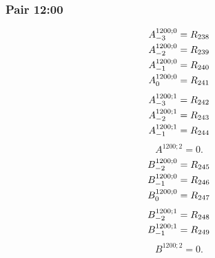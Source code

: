 \documentclass[11pt,a4paper]{article}
\begin{document}
\subsubsection{Pair 12:00}
\begin{equation}
\shortstack[l]{$\displaystyle A^{1200;0}_{-3}=R_{238}$\\
$\displaystyle A^{1200;0}_{-2}=R_{239}$\\
$\displaystyle A^{1200;0}_{-1}=R_{240}$\\
$\displaystyle A^{1200;0}_{0}=R_{241}$}
\label{eq:cat-map-270}
\end{equation}
\begin{equation}
\shortstack[l]{$\displaystyle A^{1200;1}_{-3}=R_{242}$\\
$\displaystyle A^{1200;1}_{-2}=R_{243}$\\
$\displaystyle A^{1200;1}_{-1}=R_{244}$}
\label{eq:cat-map-271}
\end{equation}
\begin{equation}
A^{1200;2}=0.
\label{eq:cat-map-272}
\end{equation}
\begin{equation}
\shortstack[l]{$\displaystyle B^{1200;0}_{-2}=R_{245}$\\
$\displaystyle B^{1200;0}_{-1}=R_{246}$\\
$\displaystyle B^{1200;0}_{0}=R_{247}$}
\label{eq:cat-map-273}
\end{equation}
\begin{equation}
\shortstack[l]{$\displaystyle B^{1200;1}_{-2}=R_{248}$\\
$\displaystyle B^{1200;1}_{-1}=R_{249}$}
\label{eq:cat-map-274}
\end{equation}
\begin{equation}
B^{1200;2}=0.
\label{eq:cat-map-275}
\end{equation}
\end{document}
